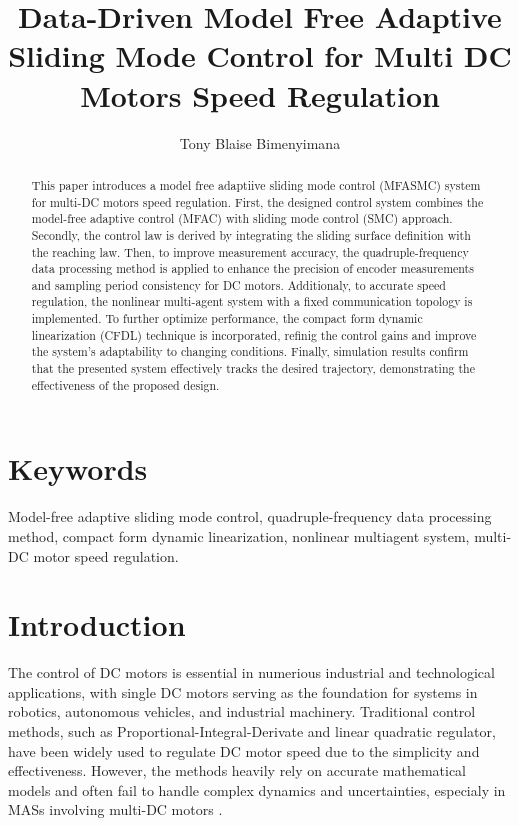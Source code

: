 \documentclass[journal,onecolumn]{IEEEtran}
\title{\LARGE Data-Driven Model Free Adaptive Sliding Mode Control for Multi DC Motors Speed Regulation}
\author{Tony Blaise Bimenyimana}
\begin{document}
\maketitle


\begin{abstract}
    This paper introduces a model free adaptiive sliding mode control (MFASMC) system for multi-DC motors speed regulation. First, the designed control system combines the model-free adaptive control (MFAC) with sliding mode control (SMC) approach. Secondly, the control law is derived by integrating the sliding surface definition with the reaching law. Then, to improve measurement accuracy, the quadruple-frequency data processing method is applied to enhance the precision of encoder measurements and sampling period consistency for DC motors. Additionaly, to accurate speed regulation, the nonlinear multi-agent system with a fixed communication topology is implemented. To further optimize performance, the compact form dynamic linearization (CFDL) technique is incorporated,  refinig the control gains and improve the system's adaptability to changing conditions. Finally, simulation results confirm that the presented system effectively tracks the desired trajectory, demonstrating the effectiveness of the proposed design.
\end{abstract}

\section*{Keywords}
Model-free adaptive sliding mode control, quadruple-frequency data processing method, compact form dynamic linearization, nonlinear multiagent system, multi-DC motor speed regulation.




\section{Introduction}\label{section:1}

The control of DC motors is essential in numerious industrial and technological applications, with single DC motors serving as the foundation for systems in robotics, autonomous vehicles, and industrial machinery. Traditional control methods, such as Proportional-Integral-Derivate and linear quadratic regulator, have been widely used to regulate DC motor speed due to the simplicity and effectiveness. However, the methods heavily rely on accurate mathematical models and often fail to handle complex dynamics and uncertainties, especialy in MASs involving multi-DC motors \cite{1}.
\end{document}
